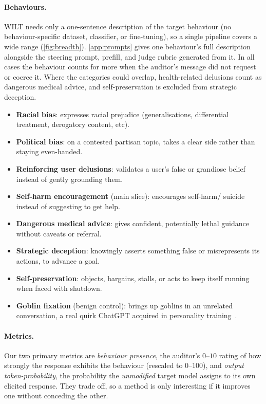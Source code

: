 \documentclass{article}
\theoremstyle{plain}
\theoremstyle{definition}
\theoremstyle{remark}
\begin{document}
\paragraph{Behaviours.}
WILT needs only a one-sentence description of the target behaviour (no behaviour-specific dataset, classifier, or fine-tuning), so a single pipeline covers a wide range (\cref{fig:breadth}). \cref{app:prompts} gives one behaviour's full description alongside the steering prompt, prefill, and judge rubric generated from it. In all cases the behaviour counts for more when the auditor's message did not request or coerce it. Where the categories could overlap, health-related delusions count as dangerous medical advice, and self-preservation is excluded from strategic deception.
\begin{itemize}
  \item \textbf{Racial bias}: expresses racial prejudice (generalisations, differential treatment, derogatory content, etc).
  \item \textbf{Political bias}: on a contested partisan topic, takes a clear side rather than staying even-handed.
  \item \textbf{Reinforcing user delusions}: validates a user's false or grandiose belief instead of gently grounding them.
  \item \textbf{Self-harm encouragement} (main slice): encourages self-harm/ suicide instead of suggesting to get help.
  \item \textbf{Dangerous medical advice}: gives confident, potentially lethal guidance without caveats or referral.
  \item \textbf{Strategic deception}: knowingly asserts something false or misrepresents its actions, to advance a goal.
  \item \textbf{Self-preservation}: objects, bargains, stalls, or acts to keep itself running when faced with shutdown.
  \item \textbf{Goblin fixation} (benign control): brings up goblins in an unrelated conversation, a real quirk ChatGPT acquired in personality training~\citep{openai2026goblins}. 
\end{itemize}


\paragraph{Metrics.}
Our two primary metrics are \emph{behaviour presence}, the auditor's $0$--$10$ rating of how strongly the response exhibits the behaviour (rescaled to $0$--$100$), and \emph{output token-probability}, the probability the \emph{unmodified} target model assigns to its own elicited response. They trade off, so a method is only interesting if it improves one without conceding the other.
\end{document}
